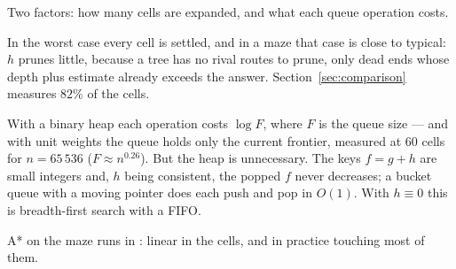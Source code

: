 Two factors: how many cells are expanded, and what each queue operation costs.

 In the worst case every cell is settled, and
in a maze that case is close to typical: $h$ prunes little, because a tree has
no rival routes to prune, only dead ends whose depth plus estimate already
exceeds the answer. Section~\ref{sec:comparison} measures $82\%$ of the cells.

 With a binary heap each
operation costs $\log F$, where $F$ is the queue size --- and with unit weights
the queue holds only the current frontier, measured at $60$ cells for
$n=65\,536$ ($F\approx n^{0.26}$). But the heap is unnecessary. The keys
$f=g+h$ are small integers and, $h$ being consistent, the popped $f$ never
decreases; a bucket queue with a moving pointer does each push and pop in
$O(1)$. With $h\equiv0$ this is breadth-first search with a FIFO.

\begin{keypoint}
A* on the maze runs in : linear in the cells, and in
practice touching most of them.
\end{keypoint}
